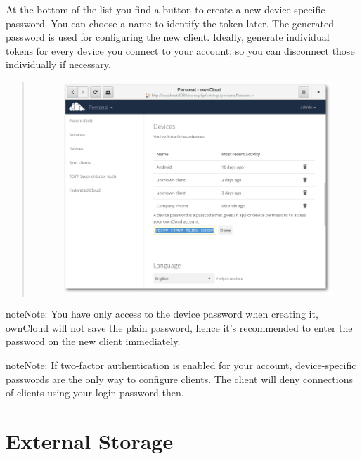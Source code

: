 \documentclass[letterpaper,10pt,english]{sphinxmanual}
\begin{document}
At the bottom of the list you find a button to create a new device-specific
password. You can choose a name to identify the token later. The generated
password is used for configuring the new client. Ideally, generate individual
tokens for every device you connect to your account, so you can disconnect
those individually if necessary.
\begin{quote}
\begin{figure}[htbp]
\centering

\includegraphics{settings_devices_add.png}
\end{figure}
\end{quote}

\begin{notice}{note}{Note:}
You have only access to the device password when creating it,
ownCloud will not save the plain password, hence it's recommended to
enter the password on the new client immediately.
\end{notice}

\begin{notice}{note}{Note:}
If two-factor authentication is enabled for your account,
device-specific passwords are the only way to configure clients. The
client will deny connections of clients using your login password then.
\end{notice}


\chapter{External Storage}
\label{external_storage/index:external-storage}\label{external_storage/index::doc}
\end{document}
